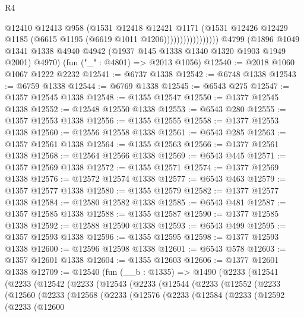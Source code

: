 \begin{lexlean}{R4}
\begin{coremodule}
                              @12410
                              @12413
                              @958
                              (@1531
                                @12418
                                @12421
                                @1171
                                (@1531
                                  @12426
                                  @12429
                                  @1185
                                  (@6615 @1195 (@6619 @1011 @1206)))))))))))))))))
    @4799
    (@1896 @1049 @1341 @1338 @4940 @4942 (@1937 @145 @1338 @1340 @1320 @1903 @1949 @2001) @4970)
    (fun ("_" : @4801) => @2013 @1056)
@12540 := @2018 @1060 @1067 @1222 @2232
@12541 := @6737 @1338
@12542 := @6748 @1338
@12543 := @6759 @1338
@12544 := @6769 @1338
@12545 := @6543 @275
@12547 := @1357 @12545 @1338
@12548 := @1355 @12547
@12550 := @1377 @12545 @1338
@12552 := @12548 @12550 @1338
@12553 := @6543 @280
@12555 := @1357 @12553 @1338
@12556 := @1355 @12555
@12558 := @1377 @12553 @1338
@12560 := @12556 @12558 @1338
@12561 := @6543 @285
@12563 := @1357 @12561 @1338
@12564 := @1355 @12563
@12566 := @1377 @12561 @1338
@12568 := @12564 @12566 @1338
@12569 := @6543 @445
@12571 := @1357 @12569 @1338
@12572 := @1355 @12571
@12574 := @1377 @12569 @1338
@12576 := @12572 @12574 @1338
@12577 := @6543 @463
@12579 := @1357 @12577 @1338
@12580 := @1355 @12579
@12582 := @1377 @12577 @1338
@12584 := @12580 @12582 @1338
@12585 := @6543 @481
@12587 := @1357 @12585 @1338
@12588 := @1355 @12587
@12590 := @1377 @12585 @1338
@12592 := @12588 @12590 @1338
@12593 := @6543 @499
@12595 := @1357 @12593 @1338
@12596 := @1355 @12595
@12598 := @1377 @12593 @1338
@12600 := @12596 @12598 @1338
@12601 := @6543 @578
@12603 := @1357 @12601 @1338
@12604 := @1355 @12603
@12606 := @1377 @12601 @1338
@12709 := @12540
    (fun (__b : @1335) =>
    @1490
      (@2233
        (@12541
          (@2233
            (@12542
              (@2233
                (@12543
                  (@2233
                    (@12544
                      (@2233
                        (@12552
                          (@2233
                            (@12560
                              (@2233
                                (@12568
                                  (@2233
                                    (@12576
                                      (@2233
                                        (@12584
                                          (@2233
                                            (@12592
                                              (@2233
                                                (@12600

\end{coremodule}
\end{lexlean}

